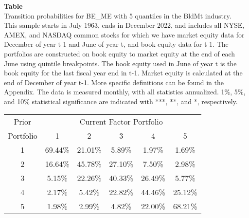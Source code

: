 \begin{table*}[ht!]
\raggedright
{}
\label{tab: transition_probs_BE_ME_BldMt_with_5_quantiles}
\textbf{Table \thetable} \\
Transition probabilities for BE_ME with 5 quantiles in the BldMt industry. \\
\hspace*{1em}This sample starts in July 1963, ends in December 2022, and includes all NYSE, AMEX, and NASDAQ common stocks for which we have market equity data for December of year t-1 and June of year t, and book equity data for t-1. The portfolios are constructed on book equity to market equity at the end of each June using quintile breakpoints.  The book equity used in June of year t is the book equity for the last fiscal year end in t-1.  Market equity is calculated at the end of December of year t-1.  More specific definitions can be found in the Appendix.  The data is measured monthly, with all statistics annualized.  1\%, 5\%, and 10\% statistical significance are indicated with ***, **, and *, respectively. \\
\vspace{0.5em}
\centering
\begin{adjustbox}{max width=\textwidth}
\begin{tabular}{@{}cccccc@{}}
\toprule
Prior & \multicolumn{5}{c}{Current Factor Portfolio} \\
Portfolio & 1 & 2 & 3 & 4 & 5 \\
\midrule
1 & 69.44\% & 21.01\% & 5.89\% & 1.97\% & 1.69\% \\
2 & 16.64\% & 45.78\% & 27.10\% & 7.50\% & 2.98\% \\
3 & 5.15\% & 22.26\% & 40.33\% & 26.49\% & 5.77\% \\
4 & 2.17\% & 5.42\% & 22.82\% & 44.46\% & 25.12\% \\
5 & 1.98\% & 2.99\% & 4.82\% & 22.00\% & 68.21\% \\
\bottomrule
\end{tabular}
\end{adjustbox}
\end{table*}